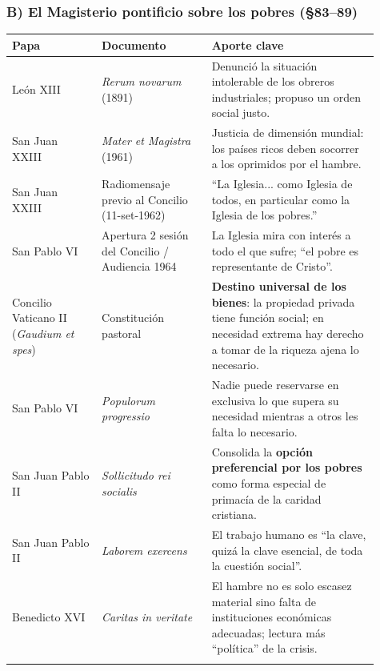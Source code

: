 \documentclass[10pt,a4paper]{article}
\begin{document}
\subsubsection{B) El Magisterio pontificio sobre los pobres (\S{}83--89)}

{\small\renewcommand{\arraystretch}{1.25}
\begin{longtable}{>{\raggedright\arraybackslash}p{0.226\linewidth}>{\raggedright\arraybackslash}p{0.275\linewidth}>{\raggedright\arraybackslash}p{0.410\linewidth}}
\toprule
\textbf{Papa} & \textbf{Documento} & \textbf{Aporte clave} \\ \midrule \endhead
León XIII & \textit{Rerum novarum} (1891) & Denunció la situación intolerable de los obreros industriales; propuso un orden social justo. \\ \addlinespace[2pt]
San Juan XXIII & \textit{Mater et Magistra} (1961) & Justicia de dimensión mundial: los países ricos deben socorrer a los oprimidos por el hambre. \\ \addlinespace[2pt]
San Juan XXIII & Radiomensaje previo al Concilio (11-set-1962) & ``La Iglesia... como Iglesia de todos, en particular como la Iglesia de los pobres.'' \\ \addlinespace[2pt]
San Pablo VI & Apertura 2\textordfeminine{} sesión del Concilio / Audiencia 1964 & La Iglesia mira con interés a todo el que sufre; ``el pobre es representante de Cristo''. \\ \addlinespace[2pt]
Concilio Vaticano II (\textit{Gaudium et spes}) & Constitución pastoral & \textbf{Destino universal de los bienes}: la propiedad privada tiene función social; en necesidad extrema hay derecho a tomar de la riqueza ajena lo necesario. \\ \addlinespace[2pt]
San Pablo VI & \textit{Populorum progressio} & Nadie puede reservarse en exclusiva lo que supera su necesidad mientras a otros les falta lo necesario. \\ \addlinespace[2pt]
San Juan Pablo II & \textit{Sollicitudo rei socialis} & Consolida la \textbf{opción preferencial por los pobres} como forma especial de primacía de la caridad cristiana. \\ \addlinespace[2pt]
San Juan Pablo II & \textit{Laborem exercens} & El trabajo humano es ``la clave, quizá la clave esencial, de toda la cuestión social''. \\ \addlinespace[2pt]
Benedicto XVI & \textit{Caritas in veritate} & El hambre no es solo escasez material sino falta de instituciones económicas adecuadas; lectura más ``política'' de la crisis. \\ \addlinespace[2pt]
\bottomrule\end{longtable}}
\end{document}
